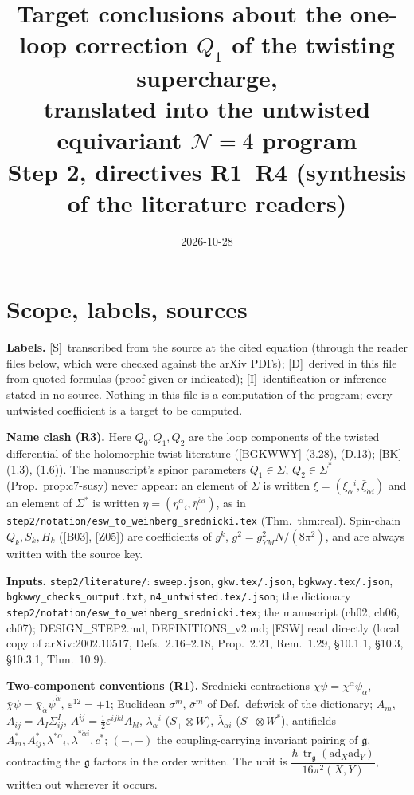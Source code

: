\documentclass[11pt]{article}
\title{Target conclusions about the one-loop correction $Q_1$ of the twisting supercharge,\\ translated into the untwisted equivariant $\mathcal N=4$ program\\[2pt]
\large Step 2, directives R1--R4 (synthesis of the literature readers)}
\date{2026-10-28}
\theoremstyle{definition}
\newcommand{\tr}{\operatorname{tr}}
\newcommand{\Sl}{\textup{[S]}}
\newcommand{\Dl}{\textup{[D]}}
\newcommand{\Il}{\textup{[I]}}
\newcommand{\unit}{\dfrac{\hbar\,\tr_{\mathfrak g}(\mathrm{ad}_X\mathrm{ad}_Y)}{16\pi^2(X,Y)}}
\begin{document}
\maketitle

\section{Scope, labels, sources}

\textbf{Labels.} \Sl\ transcribed from the source at the cited equation (through the reader files below, which were checked against the arXiv PDFs); \Dl\ derived in this file from quoted formulas (proof given or indicated); \Il\ identification or inference stated in no source. Nothing in this file is a computation of the program; every untwisted coefficient is a target to be computed.

\textbf{Name clash (R3).} Here $Q_0,Q_1,Q_2$ are the loop components of the twisted differential of the holomorphic-twist literature ([BGKWWY] (3.28), (D.13); [BK] (1.3), (1.6)). The manuscript's spinor parameters $Q_1\in\Sigma$, $Q_2\in\Sigma^*$ (Prop.~prop:c7-susy) never appear: an element of $\Sigma$ is written $\xi=(\xi_\alpha{}^i,\bar\xi_{\dot\alpha i})$ and an element of $\Sigma^*$ is written $\eta=(\eta^\alpha{}_i,\bar\eta^{\dot\alpha i})$, as in \texttt{step2/notation/esw\_to\_weinberg\_srednicki.tex} (Thm.~thm:real). Spin-chain $Q_k,S_k,H_k$ ([B03], [Z05]) are coefficients of $g^k$, $g^2=g_{YM}^2N/(8\pi^2)$, and are always written with the source key.

\textbf{Inputs.} \texttt{step2/literature/}: \texttt{sweep.json}, \texttt{gkw.tex/.json}, \texttt{bgkwwy.tex/.json}, \texttt{bgkwwy\_checks\_output.txt}, \texttt{n4\_untwisted.tex/.json}; the dictionary \texttt{step2/notation/}\allowbreak\texttt{esw\_to\_weinberg\_srednicki.tex}; the manuscript (ch02, ch06, ch07); DESIGN\_STEP2.md, DEFINITIONS\_v2.md; [ESW] read directly (local copy of arXiv:2002.10517, Defs.~2.16--2.18, Prop.~2.21, Rem.~1.29, \S10.1.1, \S10.3, \S10.3.1, Thm.~10.9).

\textbf{Two-component conventions (R1).} Srednicki contractions $\chi\psi=\chi^\alpha\psi_\alpha$, $\bar\chi\bar\psi=\bar\chi_{\dot\alpha}\bar\psi^{\dot\alpha}$, $\varepsilon^{12}=+1$; Euclidean $\sigma^m$, $\bar\sigma^m$ of Def.~def:wick of the dictionary; $A_m$, $A_{ij}=A_I\Sigma^I_{ij}$, $A^{ij}=\tfrac12\varepsilon^{ijkl}A_{kl}$, $\lambda_\alpha{}^i$ ($S_+\otimes W$), $\bar\lambda_{\dot\alpha i}$ ($S_-\otimes W^*$), antifields $A^*_m,A^*_{ij},\lambda^{*\alpha}{}_i,\bar\lambda^{*\dot\alpha i},c^*$; $(-,-)$ the coupling-carrying invariant pairing of $\mathfrak g$, contracting the $\mathfrak g$ factors in the order written. The unit is $\unit$, written out wherever it occurs.
\end{document}

